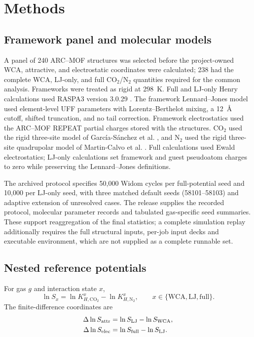 \documentclass[journal=jctcce,manuscript=article]{achemso}
\begin{document}
\section{Methods}
\subsection{Framework panel and molecular models}


A panel of 240 ARC--MOF structures \cite{burner2023arcmof} was selected before the project-owned WCA, attractive, and electrostatic coordinates were calculated; 238 had the complete WCA, LJ-only, and full CO$_2$/N$_2$ quantities required for the common analysis. Frameworks were treated as rigid at 298~K. Full and LJ-only Henry calculations used RASPA3 version 3.0.29 \cite{ran2024raspa3,dubbeldam2016raspa}. The framework Lennard--Jones model used element-level UFF parameters \cite{rappe1992uff} with Lorentz--Berthelot mixing, a 12~\AA{} cutoff, shifted truncation, and no tail correction. Framework electrostatics used the ARC--MOF REPEAT partial charges stored with the structures. CO$_2$ used the rigid three-site model of Garc\'ia-S\'anchez et al. \cite{garciasanchez2009co2}, and N$_2$ used the rigid three-site quadrupolar model of Martin-Calvo et al. \cite{martincalvo2015gases}. Full calculations used Ewald electrostatics; LJ-only calculations set framework and guest pseudoatom charges to zero while preserving the Lennard--Jones definitions.

The archived protocol specifies 50,000 Widom cycles per full-potential seed and 10,000 per LJ-only seed, with three matched default seeds (58101--58103) and adaptive extension of unresolved cases. The release supplies the recorded protocol, molecular parameter records and tabulated gas-specific seed summaries. These support reaggregation of the final statistics; a complete simulation replay additionally requires the full structural inputs, per-job input decks and executable environment, which are not supplied as a complete runnable set.


\subsection{Nested reference potentials}


For gas $g$ and interaction state $x$,
\begin{equation}
\ln S_x
=
\ln K_{H,\mathrm{CO_2}}^x
-
\ln K_{H,\mathrm{N_2}}^x,
\qquad
x\in\{\mathrm{WCA},\mathrm{LJ},\mathrm{full}\}.
\end{equation}
The finite-difference coordinates are
\begin{align}
\Delta\ln S_{\rm attr} &= \ln S_{\rm LJ}-\ln S_{\rm WCA},\\
\Delta\ln S_{\rm elec} &= \ln S_{\rm full}-\ln S_{\rm LJ}.
\end{align}
\end{document}

